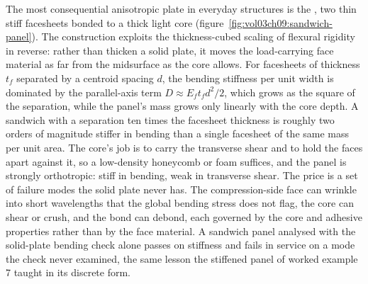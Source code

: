 The most consequential anisotropic plate in everyday structures is the
, two thin stiff facesheets bonded to a thick
light core (figure~\ref{fig:vol03ch09:sandwich-panel}). The construction
exploits the thickness-cubed scaling of flexural rigidity in reverse:
rather than thicken a solid plate, it moves the load-carrying face
material as far from the midsurface as the core allows. For facesheets of
thickness $t_f$ separated by a centroid spacing $d$, the bending
stiffness per unit width is dominated by the parallel-axis term
$D \approx E_f t_f d^2/2$, which grows as the square of the separation,
while the panel's mass grows only linearly with the core depth. A
sandwich with a separation ten times the facesheet thickness is roughly
two orders of magnitude stiffer in bending than a single facesheet of the
same mass per unit area. The core's job is to carry the transverse shear
and to hold the faces apart against it, so a low-density honeycomb or
foam suffices, and the panel is strongly orthotropic: stiff in bending,
weak in transverse shear. The price is a set of failure modes the solid
plate never has. The compression-side face can wrinkle into short
wavelengths that the global bending stress does not flag, the core can
shear or crush, and the bond can debond, each governed by the core and
adhesive properties rather than by the face material. A sandwich panel
analysed with the solid-plate bending check alone passes on stiffness and
fails in service on a mode the check never examined, the same lesson the
stiffened panel of worked example 7 taught in its discrete form.



